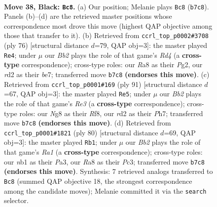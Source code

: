 \documentclass[11pt]{article}
\begin{document}
\clearpage

\begin{figure}[p]\centering
\begin{subfigure}{0.46\textwidth}\centering
\resizebox{\linewidth}{!}{%
\newchessgame
\chessboard[
  setfen={r5n1/1bp1k1b1/p1p5/7R/8/8/3R4/1NB1K3 b - - 2 38},
  showmover=false,
  pgfstyle=straightmove, color=movearrow, markmove={b7-c8}
]}
\caption{}
\end{subfigure}\hfill
\begin{subfigure}{0.46\textwidth}\centering
\resizebox{\linewidth}{!}{%
\newchessgame
\chessboard[
  setfen={6k1/4b1p1/1p6/2r5/2PR3P/5N2/6PK/8 w - - 3 39},
  showmover=false,
  pgfstyle=straightmove, color=movearrow, markmove={d4-e4}
]}
\caption{}
\end{subfigure}
\\[4pt]
\begin{subfigure}{0.46\textwidth}\centering
\resizebox{\linewidth}{!}{%
\newchessgame
\chessboard[
  setfen={5r1k/7p/4r3/5np1/6R1/P1P1p3/2K1B2P/3R4 b - - 3 46},
  showmover=false,
  pgfstyle=straightmove, color=movearrow, markmove={e6-e5}
]}
\caption{}
\end{subfigure}\hfill
\begin{subfigure}{0.46\textwidth}\centering
\resizebox{\linewidth}{!}{%
\newchessgame
\chessboard[
  setfen={8/5k2/p1b4p/6r1/3B4/P1P4P/5K2/R7 w - - 5 41},
  showmover=false,
  pgfstyle=straightmove, color=movearrow, markmove={a1-b1}
]}
\caption{}
\end{subfigure}
\caption{\textbf{Move 38, Black: \texttt{Bc8}.} (a) Our position; Melanie plays \texttt{Bc8} (\texttt{b7c8}). Panels (b)--(d) are the retrieved master positions whose correspondence most drove this move (highest QAP objective among those that transfer to it). (b) Retrieved from \texttt{ccrl\_top\_p0002\#3708} (ply 76) [structural distance $d$=79, QAP obj=3]: the master played \texttt{Re4}; under $\mu$ our \emph{Bb2} plays the role of that game's \emph{Rd4} (a \textbf{cross-type} correspondence); cross-type roles: our \emph{R}a8 as their \emph{P}g2, our \emph{r}d2 as their \emph{b}e7; transferred move \texttt{b7c8} \textbf{(endorses this move)}. (c) Retrieved from \texttt{ccrl\_top\_p0001\#169} (ply 91) [structural distance $d$=67, QAP obj=3]: the master played \texttt{Re5}; under $\mu$ our \emph{Bb2} plays the role of that game's \emph{Re3} (a \textbf{cross-type} correspondence); cross-type roles: our \emph{N}g8 as their \emph{R}f8, our \emph{r}d2 as their \emph{P}h7; transferred move \texttt{b7c8} \textbf{(endorses this move)}. (d) Retrieved from \texttt{ccrl\_top\_p0001\#1821} (ply 80) [structural distance $d$=69, QAP obj=3]: the master played \texttt{Rb1}; under $\mu$ our \emph{Bb2} plays the role of that game's \emph{Ra1} (a \textbf{cross-type} correspondence); cross-type roles: our \emph{n}b1 as their \emph{P}a3, our \emph{R}a8 as their \emph{P}c3; transferred move \texttt{b7c8} \textbf{(endorses this move)}. Synthesis: 7 retrieved analogs transferred to \texttt{Bc8} (summed QAP objective 18, the strongest correspondence among the candidate moves); Melanie committed it via the \texttt{search} selector.}
\label{fig:thought-m75}
\end{figure}
\end{document}
